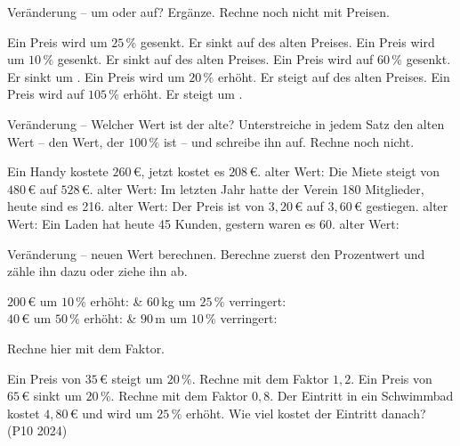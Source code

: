 \clearpage
\setcounter{aufgabe}{29}
\label{e5}

\begin{aufgabe}{Veränderung – um oder auf? Ergänze. Rechne noch nicht mit Preisen.}
\begin{teile}
\teil Ein Preis wird um $25\,\%$ gesenkt. Er sinkt auf \leerfeld[\%] des alten Preises.
\teil Ein Preis wird um $10\,\%$ gesenkt. Er sinkt auf \leerfeld[\%] des alten Preises.
\teil Ein Preis wird auf $60\,\%$ gesenkt. Er sinkt um \leerfeld[\%].
\teil Ein Preis wird um $20\,\%$ erhöht. Er steigt auf \leerfeld[\%] des alten Preises.
\teil Ein Preis wird auf $105\,\%$ erhöht. Er steigt um \leerfeld[\%].
\end{teile}
\end{aufgabe}

\begin{aufgabe}{Veränderung – Welcher Wert ist der alte? Unterstreiche in jedem Satz den alten Wert – den Wert, der $100\,\%$ ist – und schreibe ihn auf. Rechne noch nicht.}
\begin{teile}
\teil Ein Handy kostete $260\,€$, jetzt kostet es $208\,€$. \hfill alter Wert: \leerfeld
\teil Die Miete steigt von $480\,€$ auf $528\,€$. \hfill alter Wert: \leerfeld
\teil Im letzten Jahr hatte der Verein 180 Mitglieder, heute sind es 216. \hfill alter Wert: \leerfeld
\teil Der Preis ist von $3{,}20\,€$ auf $3{,}60\,€$ gestiegen. \hfill alter Wert: \leerfeld
\teil Ein Laden hat heute 45 Kunden, gestern waren es 60. \hfill alter Wert: \leerfeld
\end{teile}
\end{aufgabe}

\begin{aufgabe}{Veränderung – neuen Wert berechnen. Berechne zuerst den Prozentwert und zähle ihn dazu oder ziehe ihn ab.}
\begin{teilezwei}
\tz $200\,€$ um $10\,\%$ erhöht: \leerfeld & \tz $60\,$kg um $25\,\%$ verringert: \leerfeld \\
\tz $40\,€$ um $50\,\%$ erhöht: \leerfeld & \tz $90\,$m um $10\,\%$ verringert: \leerfeld \\
\end{teilezwei}
Rechne hier mit dem Faktor.
\begin{teile}
\teil Ein Preis von $35\,€$ steigt um $20\,\%$. Rechne mit dem Faktor $1{,}2$. \leerfeld[€]
\teil Ein Preis von $65\,€$ sinkt um $20\,\%$. Rechne mit dem Faktor $0{,}8$. \leerfeld[€]
\teil Der Eintritt in ein Schwimmbad kostet $4{,}80\,€$ und wird um $25\,\%$ erhöht. Wie viel kostet der Eintritt danach? \hfill (P10 2024) \\ \leerfeld[€]
\end{teile}
\end{aufgabe}

